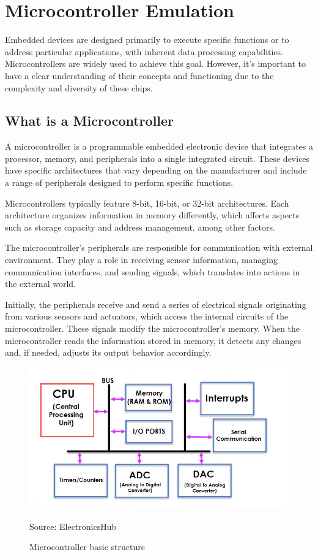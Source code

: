 \documentclass[../monografia.tex]{subfiles}
\begin{document}
\section{Microcontroller Emulation}

Embedded devices are designed primarily to execute specific functions or to address particular applications, with inherent data processing capabilities. Microcontrollers are widely used to achieve this goal. However, it’s important to have a clear understanding of their concepts and functioning due to the complexity and diversity of these chips.

\subsection{What is a Microcontroller}

A microcontroller is a programmable embedded electronic device that integrates a processor, memory, and peripherals into a single integrated circuit. These devices have specific architectures that vary depending on the manufacturer and include a range of peripherals designed to perform specific functions.

Microcontrollers typically feature 8-bit, 16-bit, or 32-bit architectures. Each architecture organizes information in memory differently, which affects aspects such as storage capacity and address management, among other factors.

The microcontroller's peripherals are responsible for communication with external environment. They play a role in receiving sensor information, managing communication interfaces, and sending signals, which translates into actions in the external world.

Initially, the peripherals receive and send a series of electrical signals originating from various sensors and actuators, which access the internal circuits of the microcontroller. These signals modify the microcontroller’s memory. When the microcontroller reads the information stored in memory, it detects any changes and, if needed, adjusts its output behavior accordingly.
\begin{figure}[h!]
\centering
    \caption{Microcontroller basic structure}
    \centering %
    \includegraphics[width=14cm]{microcontroller_structure.png}
    \par
    Source: ElectronicsHub \cite{eletronic_hub_23}
    \label{fig: Microcontroller basic structure}
\end{figure}
\end{document}
